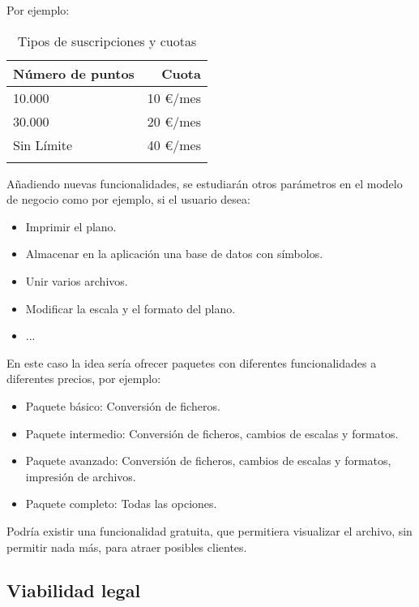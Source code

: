 Por ejemplo:
\begin{longtable}[]{@{}lr@{}}
\toprule
\begin{minipage}[b]{0.3\columnwidth}\raggedright\strut
\textbf{Número de puntos}\strut
\end{minipage} & \begin{minipage}[b]{0.18\columnwidth}\raggedright\strut
\textbf{Cuota}\strut
\end{minipage}\tabularnewline
\midrule
\endhead
\begin{minipage}[t]{0.3\columnwidth}\raggedright\strut
10.000 \strut
\end{minipage} & \begin{minipage}[t]{0.18\columnwidth}\raggedright\strut
10 \euro{}/mes \strut
\end{minipage}\tabularnewline
\begin{minipage}[t]{0.3\columnwidth}\raggedright\strut
30.000 \strut
\end{minipage} & \begin{minipage}[t]{0.18\columnwidth}\raggedright\strut
20 \euro{}/mes \strut
\end{minipage}\tabularnewline
\begin{minipage}[t]{0.3\columnwidth}\raggedright\strut
Sin Límite \strut
\end{minipage} & \begin{minipage}[t]{0.18\columnwidth}\raggedright\strut
40 \euro{}/mes \strut
\end{minipage}\tabularnewline
\bottomrule
\caption{Tipos de suscripciones y cuotas}
\end{longtable}

Añadiendo nuevas funcionalidades, se estudiarán otros parámetros en el modelo de negocio como por ejemplo, si el usuario desea:
\begin{itemize}
\item Imprimir el plano.
\item Almacenar en la aplicación una base de datos con símbolos.
\item Unir varios archivos.
\item Modificar la escala y el formato del plano.
\item ...
\end{itemize}

En este caso la idea sería ofrecer paquetes con diferentes funcionalidades a diferentes precios, por ejemplo:

\begin{itemize}
\item Paquete básico: Conversión de ficheros.
\item Paquete intermedio: Conversión de ficheros, cambios de escalas y formatos.
\item Paquete avanzado: Conversión de ficheros, cambios de escalas y formatos, impresión de archivos.
\item Paquete completo: Todas las opciones.
\end{itemize}

Podría existir una funcionalidad gratuita, que permitiera visualizar el archivo, sin permitir nada más, para atraer posibles clientes.



\subsection{Viabilidad legal}
